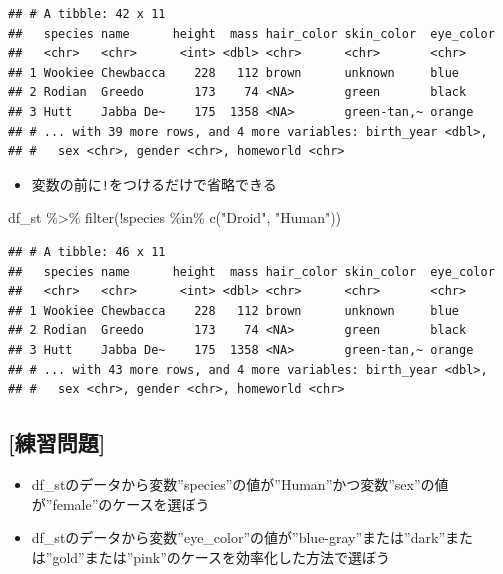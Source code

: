 \documentclass[
  xelatex,ja=standard, b5paper]{bxjsbook}
\newenvironment{Shaded}{\begin{snugshade}}{\end{snugshade}}
\newcommand{\FunctionTok}[1]{\textcolor[rgb]{0.00,0.00,0.00}{#1}}
\newcommand{\NormalTok}[1]{#1}
\newcommand{\SpecialCharTok}[1]{\textcolor[rgb]{0.00,0.00,0.00}{#1}}
\newcommand{\StringTok}[1]{\textcolor[rgb]{0.31,0.60,0.02}{#1}}
\providecommand{\tightlist}{%
  \setlength{\itemsep}{0pt}\setlength{\parskip}{0pt}}
\begin{document}
\begin{verbatim}
## # A tibble: 42 x 11
##   species name      height  mass hair_color skin_color  eye_color
##   <chr>   <chr>      <int> <dbl> <chr>      <chr>       <chr>    
## 1 Wookiee Chewbacca    228   112 brown      unknown     blue     
## 2 Rodian  Greedo       173    74 <NA>       green       black    
## 3 Hutt    Jabba De~    175  1358 <NA>       green-tan,~ orange   
## # ... with 39 more rows, and 4 more variables: birth_year <dbl>,
## #   sex <chr>, gender <chr>, homeworld <chr>
\end{verbatim}

\begin{itemize}
\tightlist
\item
  変数の前に\texttt{!}をつけるだけで省略できる
\end{itemize}

\begin{Shaded}
\begin{Highlighting}[]
\NormalTok{df\_st }\SpecialCharTok{\%\textgreater{}\%} 
  \FunctionTok{filter}\NormalTok{(}\SpecialCharTok{!}\NormalTok{species }\SpecialCharTok{\%in\%} \FunctionTok{c}\NormalTok{(}\StringTok{"Droid"}\NormalTok{, }\StringTok{"Human"}\NormalTok{))}
\end{Highlighting}
\end{Shaded}

\begin{verbatim}
## # A tibble: 46 x 11
##   species name      height  mass hair_color skin_color  eye_color
##   <chr>   <chr>      <int> <dbl> <chr>      <chr>       <chr>    
## 1 Wookiee Chewbacca    228   112 brown      unknown     blue     
## 2 Rodian  Greedo       173    74 <NA>       green       black    
## 3 Hutt    Jabba De~    175  1358 <NA>       green-tan,~ orange   
## # ... with 43 more rows, and 4 more variables: birth_year <dbl>,
## #   sex <chr>, gender <chr>, homeworld <chr>
\end{verbatim}

\hypertarget{ux7df4ux7fd2ux554fux984c-7}{%
\subsection{{[}練習問題{]}}\label{ux7df4ux7fd2ux554fux984c-7}}

\begin{itemize}
\tightlist
\item
  df\_stのデータから変数''species''の値が''Human''かつ変数''sex''の値が''female''のケースを選ぼう
\item
  df\_stのデータから変数''eye\_color''の値が''blue-gray''または''dark''または''gold''または''pink''のケースを効率化した方法で選ぼう
\end{itemize}
\end{document}
